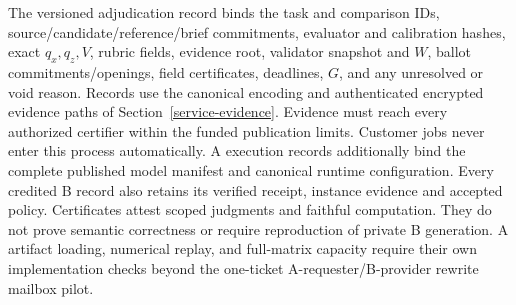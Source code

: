 The versioned adjudication record binds the task and comparison IDs,
source/candidate/reference/brief commitments, evaluator and calibration
hashes, exact \(q_x,q_z,V\), rubric fields, evidence root, validator
snapshot and \(W\), ballot commitments/openings, field certificates,
deadlines, \(G\), and any unresolved or void reason. Records use the
canonical encoding and authenticated encrypted evidence paths of
Section~\ref{service-evidence}. Evidence must reach every authorized
certifier within the funded publication limits. Customer jobs never
enter this process automatically. A execution records additionally bind
the complete published model manifest and canonical runtime configuration.
Every credited B record also retains its verified receipt, instance evidence
and accepted policy. Certificates attest scoped judgments and faithful computation. They do
not prove semantic correctness or require reproduction of private B
generation. A artifact loading, numerical replay, and full-matrix
capacity require their own implementation checks beyond the one-ticket
A-requester/B-provider rewrite mailbox pilot.
